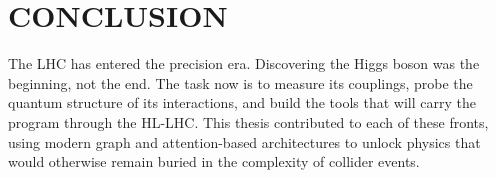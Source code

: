 \begingroup
\clearpage%
\let\clearpage\relax%
\vspace*{-16pt}%
\chapter[CONCLUSION]{CONCLUSION}
\endgroup

The LHC has entered the precision era. Discovering the Higgs boson was the beginning, not the end. The task now is to measure its couplings, probe the quantum structure of its interactions, and build the tools that will carry the program through the HL-LHC. This thesis contributed to each of these fronts, using modern graph and attention-based architectures to unlock physics that would otherwise remain buried in the complexity of collider events.

